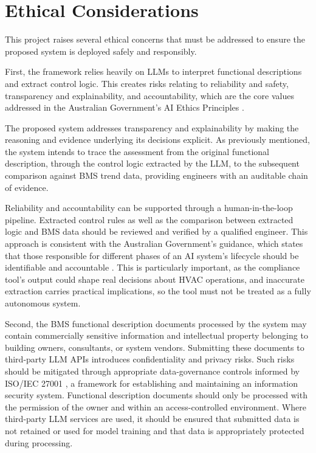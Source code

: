 \documentclass{article}
\begin{document}
\section{Ethical Considerations}

This project raises several ethical concerns that must be addressed to ensure the proposed system is deployed safely and responsibly.

First, the framework relies heavily on LLMs to interpret functional descriptions and extract control logic. This creates risks relating to reliability and safety, transparency and explainability, and accountability, which are the core values addressed in the Australian Government's AI Ethics Principles \parencite{australias_ai_ethics_principles}. 

The proposed system addresses transparency and explainability by making the reasoning and evidence underlying its decisions explicit. As previously mentioned, the system intends to trace the assessment from the original functional description, through the control logic extracted by the LLM, to the subsequent comparison against BMS trend data, providing engineers with an auditable chain of evidence.

Reliability and accountability can be supported through a human-in-the-loop pipeline. Extracted control rules as well as the comparison between extracted logic and BMS data should be reviewed and verified by a qualified engineer. This approach is consistent with the Australian Government's guidance, which states that those responsible for different phases of an AI system's lifecycle should be identifiable and accountable \parencite{australias_ai_ethics_principles}. This is particularly important, as the compliance tool's output could shape real decisions about HVAC operations, and inaccurate extraction carries practical implications, so the tool must not be treated as a fully autonomous system.

Second, the BMS functional description documents processed by the system may contain commercially sensitive information and intellectual property belonging to building owners, consultants, or system vendors. Submitting these documents to third-party LLM APIs introduces confidentiality and privacy risks. Such risks should be mitigated through appropriate data-governance controls informed by ISO/IEC 27001 \parencite{iso27001}, a framework for establishing and maintaining an information security system. Functional description documents should only be processed with the permission of the owner and within an access-controlled environment. Where third-party LLM services are used, it should be ensured that submitted data is not retained or used for model training and that data is appropriately protected during processing.
\end{document}
